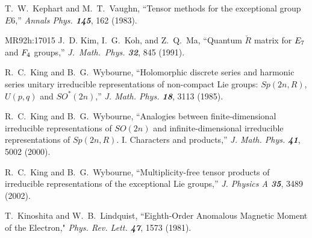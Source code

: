T.~W.~Kephart and M.~T.~Vaughn,
``Tensor methods for the exceptional group $E6$,''
{\em Annals Phys.    \bf 145}, 162 (1983).



        {MR92h:17015}
J.~D. Kim, I.~G.~Koh, and Z.~Q.~Ma,
``Quantum $\check R$ matrix for $E\sb 7$ and $F\sb 4$ groups,''
{\em J.~Math.~Phys.  \bf 32}, 845 (1991). %




 R.~C.~King and B.~G.~Wybourne,
    ``Holomorphic discrete series and harmonic series unitary
      irreducible representations of non-compact Lie groups:
      $Sp(2n,R)$, $U(p,q)$ and $SO^*(2n)$,''
    {\em J. Math. Phys. \bf 18}, 3113 (1985). %

 R.~C.~King and B.~G.~Wybourne,
``Analogies between finite-dimensional irreducible representations of
  $SO(2n)$ and infinite-dimensional irreducible representations of $Sp(2n,R)$.
  I. Characters and products,''
  {\em J. Math. Phys. \bf 41}, 5002 (2000).

 R.~C.~King and B.~G.~Wybourne,
``Multiplicity-free tensor products of irreducible representations of the
exceptional Lie groups,''
    {\em J. Physics A  \bf 35}, 3489 (2002).
%
%

 T.~Kinoshita  and W.~B.~Lindquist,
        ``Eighth-Order Anomalous Magnetic Moment of the Electron,"
        {\em Phys. Rev. Lett.  \bf 47}, 1573  (1981). %

